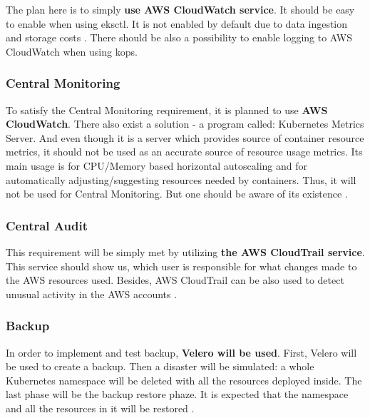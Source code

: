 The plan here is to simply \textbf{use AWS CloudWatch service}. It should be easy to enable when using eksctl. It is not enabled by default due to data ingestion and storage costs \cite{eksctl-cw}. There should be also a possibility to enable logging to AWS CloudWatch when using kops.

\subsubsection{Central Monitoring}

To satisfy the Central Monitoring requirement, it is planned to use \textbf{AWS CloudWatch}. There also exist a solution - a program called: Kubernetes Metrics Server. And even though it is a server which provides source of container resource metrics, it should not be used as an accurate source of resource usage metrics. Its main usage is for CPU/Memory based horizontal autoscaling and for automatically adjusting/suggesting resources needed by containers. Thus, it will not be used for Central Monitoring. But one should be aware of its existence \cite{k8s-metrics-server}.


\subsubsection{Central Audit}

This requirement will be simply met by utilizing \textbf{the AWS CloudTrail service}. This service should show us, which user is responsible for what changes made to the AWS resources used. Besides, AWS CloudTrail can be also used to detect unusual activity in the AWS accounts \cite{online-ct}.

\subsubsection{Backup}

In order to implement and test backup, \textbf{Velero will be used}. First, Velero will be used to create a backup. Then a disaster will be simulated: a whole Kubernetes namespace will be deleted with all the resources deployed inside. The last phase will be the backup restore phaze. It is expected that the namespace and all the resources in it will be restored \cite{eksworkshop-backup} \cite{velero-examples}.

